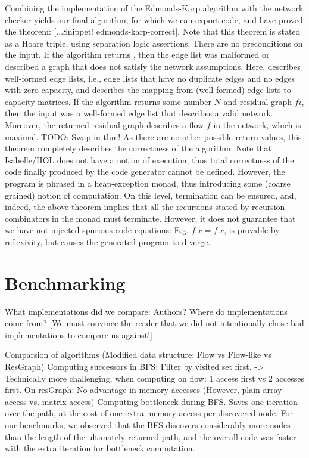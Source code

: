 \documentclass{llncs}
\begin{document}
  Combining the implementation of the Edmonds-Karp algorithm with the network checker yields our final algorithm,
  for which we can export code, and have proved the theorem: [...Snippet! edmonds-karp-correct]. 
  Note that this theorem is stated as a Hoare triple, using separation logic assertions. There are no preconditions on the input.
  If the algorithm returns , then the edge list was malformed or described a graph that does not satisfy the network assumptions.
  Here,  describes well-formed edge lists, i.e., edge lists that have no duplicate edges and no edges with zero capacity,
  and  describes the mapping from (well-formed) edge lists to capacity matrices.
  If the algorithm returns some number $N$ and residual graph $fi$, then the input was a well-formed edge list that describes a valid network.
  Moreover, the returned residual graph describes a flow $f$ in the network, which is maximal. TODO: Swap in thm!
  As there are no other possible return values, this theorem completely describes the correctness of the algorithm. 
  Note that Isabelle/HOL does not have a notion of execution, thus total correctness of the code finally produced by the code 
  generator cannot be defined. However, the program is phrased in a heap-exception monad, thus introducing some (coarse grained) notion of
  computation. On this level, termination can be ensured, and, indeed, the above theorem implies that all the recursions stated by recursion 
  combinators in the monad must terminate. However, it does not guarantee that we have not injected spurious code equations: E.g. $f~x = f~x$,
  is provable by reflexivity, but causes the generated program to diverge.

    
    

\section{Benchmarking}
  What implementations did we compare: Authors? Where do implementations come from? 
  [We must convince the reader that we did not intentionally chose bad implementations to compare us against!]

  Comparsion of algorithms (Modified data structure: Flow vs Flow-like vs ResGraph)
    Computing successors in BFS: Filter by visited set first.
      -> Technically more challenging, when computing on flow: 1 access first vs 2 accesses first. On resGraph: No advantage in memory accesses (However, plain array access vs. matrix access)
    Computing bottleneck during BFS. Saves one iteration over the path, at the cost of one extra memory access per discovered node.
    For our benchmarks, we observed that the BFS discovers considerably more nodes than the length of the ultimately returned path, 
    and the overall code was faster with the extra iteration for bottleneck computation.
    
\end{document}

